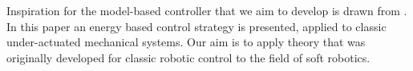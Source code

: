 Inspiration for the model-based controller that we aim to develop is drawn from \cite{spong1996energy}. In this paper an energy based control strategy is presented, applied to classic under-actuated mechanical systems. Our aim is to apply theory that was originally developed for classic robotic control to the field of soft robotics.







